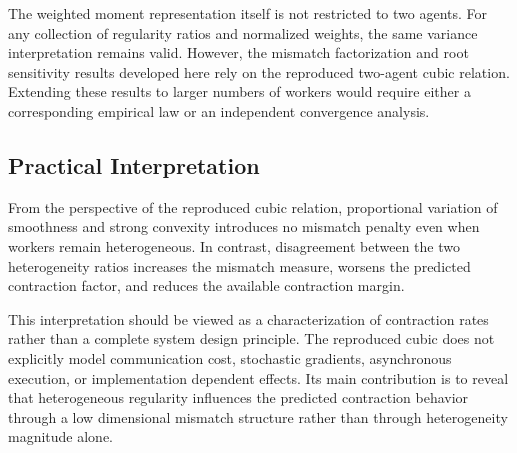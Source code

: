 \documentclass[mathematics,article,submit,moreauthors]{Definitions/mdpi}
\begin{document}
The weighted moment representation itself is not restricted to two agents. For any collection of regularity ratios and normalized weights, the same variance interpretation remains valid. However, the mismatch factorization and root sensitivity results developed here rely on the reproduced two-agent cubic relation. Extending these results to larger numbers of workers would require either a corresponding empirical law or an independent convergence analysis.

\subsection{Practical Interpretation}
From the perspective of the reproduced cubic relation, proportional variation of smoothness and strong convexity introduces no mismatch penalty even when workers remain heterogeneous. In contrast, disagreement between the two heterogeneity ratios increases the mismatch measure, worsens the predicted contraction factor, and reduces the available contraction margin.

This interpretation should be viewed as a characterization of contraction rates rather than a complete system design principle. The reproduced cubic does not explicitly model communication cost, stochastic gradients, asynchronous execution, or implementation dependent effects. Its main contribution is to reveal that heterogeneous regularity influences the predicted contraction behavior through a low dimensional mismatch structure rather than through heterogeneity magnitude alone.
\end{document}

